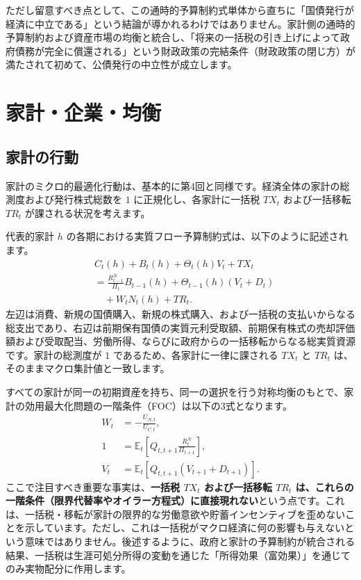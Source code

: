 \documentclass[
  japanese,
  lualatex,
  ja=standard,
  12pt,
  a4paper]{ltjsarticle}
\begin{document}
ただし留意すべき点として、この通時的予算制約式単体から直ちに「国債発行が経済に中立である」という結論が導かれるわけではありません。家計側の通時的予算制約および資産市場の均衡と統合し、「将来の一括税の引き上げによって政府債務が完全に償還される」という財政政策の完結条件（財政政策の閉じ方）が満たされて初めて、公債発行の中立性が成立します。

\section{家計・企業・均衡}\label{ux5bb6ux8a08ux4f01ux696dux5747ux8861}

\subsection{家計の行動}\label{ux5bb6ux8a08ux306eux884cux52d5}

家計のミクロ的最適化行動は、基本的に第4回と同様です。経済全体の家計の総測度および発行株式総数を
\(1\) に正規化し、各家計に一括税 \(TX_t\) および一括移転 \(TR_t\)
が課される状況を考えます。

代表的家計 \(h\)
の各期における実質フロー予算制約式は、以下のように記述されます。 \[
\begin{aligned}
&C_t(h) + B_t(h) + \Theta_t(h) V_t + TX_t\\
&= \frac{R_{t-1}^N}{\Pi_t} B_{t-1}(h)
 + \Theta_{t-1}(h) (V_t + D_t)\\
&\quad + W_t N_t(h) + TR_t.
\end{aligned}
\]
左辺は消費、新規の国債購入、新規の株式購入、および一括税の支払いからなる総支出であり、右辺は前期保有国債の実質元利受取額、前期保有株式の売却評価額および受取配当、労働所得、ならびに政府からの一括移転からなる総実質資源です。家計の総測度が
\(1\) であるため、各家計に一律に課される \(TX_t\) と \(TR_t\)
は、そのままマクロ集計値と一致します。

すべての家計が同一の初期資産を持ち、同一の選択を行う対称均衡のもとで、家計の効用最大化問題の一階条件（FOC）は以下の3式となります。
\[
\begin{aligned}
W_t &= -\frac{U_{N,t}}{U_{C,t}},\\
1 &= \mathbb{E}_t \left[ Q_{t,t+1} \frac{R_t^N}{\Pi_{t+1}} \right],\\
V_t &= \mathbb{E}_t \left[ Q_{t,t+1} (V_{t+1} + D_{t+1}) \right].
\end{aligned}
\] ここで注目すべき重要な事実は、\textbf{一括税 \(TX_t\) および一括移転
\(TR_t\)
は、これらの一階条件（限界代替率やオイラー方程式）に直接現れない}という点です。これは、一括税・移転が家計の限界的な労働意欲や貯蓄インセンティブを歪めないことを示しています。ただし、これは一括税がマクロ経済に何の影響も与えないという意味ではありません。後述するように、政府と家計の予算制約が統合される結果、一括税は生涯可処分所得の変動を通じた「所得効果（富効果）」を通じてのみ実物配分に作用します。
\end{document}
